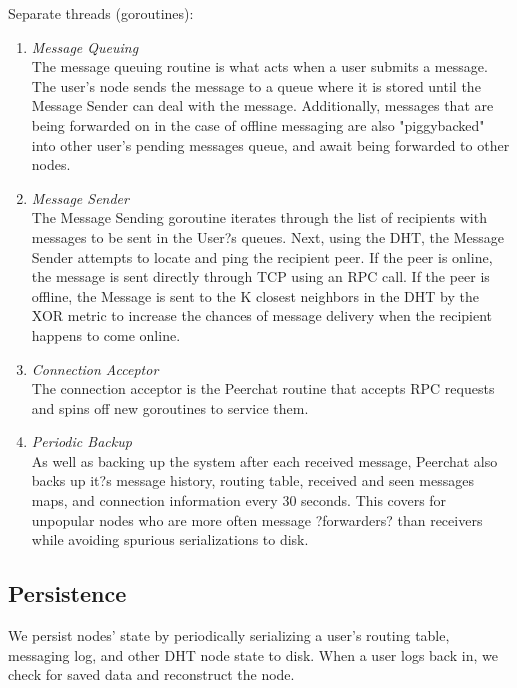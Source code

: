 \documentclass{article}
\begin{document}
Separate threads (goroutines):
\begin{enumerate}
	\item \textit{Message Queuing} \\
	The message queuing routine is what acts when a user submits a message. The user's node sends the message to a queue where it is stored until the Message Sender can deal with the message. Additionally, messages that are being forwarded on in the case of offline messaging are also "piggybacked" into other user's pending messages queue, and await being forwarded to other nodes. 

	\item \textit{Message Sender} \\
	The Message Sending goroutine iterates through the list of recipients with messages to be sent in the User?s queues.  Next, using the DHT, the Message Sender attempts to locate and ping the recipient peer. If the peer is online, the message is sent directly through TCP using an RPC call. If the peer is offline, the Message is sent to the K closest neighbors in the DHT by the XOR metric to increase the chances of message delivery when the recipient happens to come online. 

	\item \textit{Connection Acceptor} \\
The connection acceptor is the Peerchat routine that accepts RPC requests and spins off new goroutines to service them. 

	\item \textit{Periodic Backup} \\
	As well as backing up the system after each received message, Peerchat also backs up it?s message history, routing table, received and seen messages maps, and connection information every 30 seconds. This covers for unpopular nodes who are more often message ?forwarders? than receivers while avoiding spurious serializations to disk. 
\end{enumerate}

\subsection{Persistence}

We persist nodes' state by periodically serializing a user's routing table, messaging log, and other DHT node state to disk. When a user logs back in, we check for saved data and reconstruct the node. \\
\end{document}
